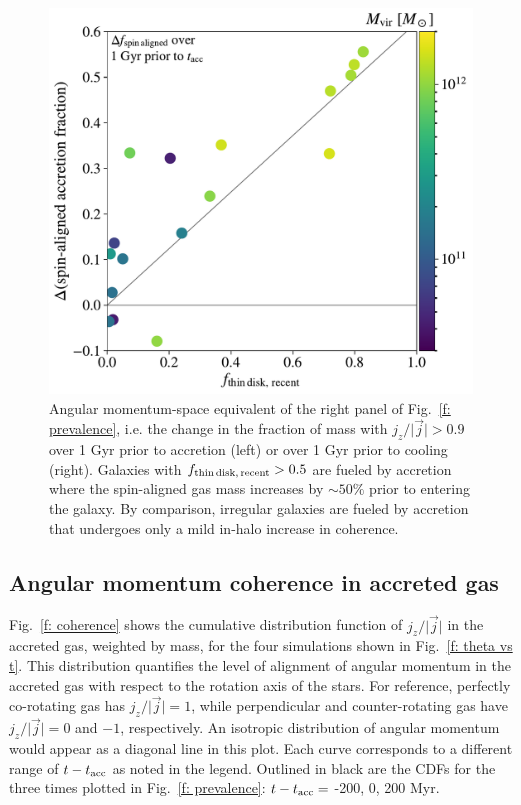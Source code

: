 \documentclass[fleqn,usenatbib]{mnras}
\newcommand{\fthin}{f_{\rm thin\,disk,\,recent}}
\newcommand{\tacc}{t_{\rm acc}}
\begin{document}
\begin{figure}
    \centering
    \includegraphics[width=\columnwidth]{figures/variations/relative_to_accretion/prevalence/delta_smooth_jdisk_frac_v_thin_disk_frac_recent.pdf}
    
    \caption{
    Angular momentum-space equivalent of the right panel of Fig.~\ref{f: prevalence}, i.e. the change in the fraction of mass with $j_z/\vert \vec j \vert > 0.9$ over 1 Gyr prior to accretion (left) or over 1 Gyr prior to cooling (right).
    Galaxies with $\fthin > 0.5$ are fueled by accretion where the spin-aligned gas mass increases by $\sim 50\%$ prior to entering the galaxy.
    By comparison, irregular galaxies are fueled by accretion that undergoes only a mild in-halo increase in coherence.
    }
    \label{f: prevalence - angular momentum}
\end{figure}

\subsection{Angular momentum coherence in accreted gas}
\label{s: mechanics -- coherence}

Fig.~\ref{f: coherence} shows the cumulative distribution function of $j_z / \vert \vec j \vert$ in the accreted gas, weighted by mass, for the four simulations shown in Fig.~\ref{f: theta vs t}.
This distribution quantifies the level of alignment of angular momentum in the accreted gas with respect to the rotation axis of the stars.
For reference, perfectly co-rotating gas has $j_z / \vert \vec j \vert = 1$, while perpendicular and counter-rotating gas have $j_z / \vert \vec j \vert = 0$ and $-1$, respectively.
An isotropic distribution of angular momentum would appear as a diagonal line in this plot. 
Each curve corresponds to a different range of $t - \tacc$ as noted in the legend. 
Outlined in black are the CDFs for the three times plotted in Fig.~\ref{f: prevalence}: $t - \tacc =$ -200, 0, 200 Myr.
\end{document}
